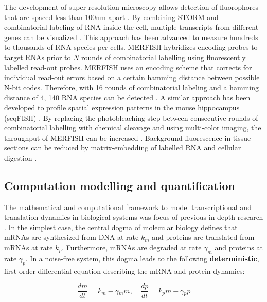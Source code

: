 The development of super-resolution microscopy allows detection of fluorophores that are spaced less than 100nm apart \citep{Sydor2015}. By combining \gls{STORM} and combinatorial labeling of RNA inside the cell, multiple transcripts from different genes can be visualized \citep{Lubeck2012}. This approach has been advanced to measure hundreds to thousands of RNA species per cells. \Gls{MERFISH} hybridizes encoding probes to target RNAs prior to $N$ rounds of combinatorial labelling using fluorescently labelled read-out probes. MERFISH uses an encoding scheme that corrects for individual read-out errors based on a certain hamming distance between possible N-bit codes. Therefore, with 16 rounds of combinatorial labeling and a hamming distance of 4, 140 RNA species can be detected \citep{Chen2015}. A similar approach has been developed to profile spatial expression patterns in the mouse hippocampus (seqFISH) \citep{Shah2016}. By replacing the photobleaching step between consecutive rounds of combinatorial labelling with chemical cleavage and using multi-color imaging, the throughput of MERFISH can be increased \citep{Moffitt2016a}. Background fluorescence in tissue sections can be reduced by matrix-embedding of labelled RNA and cellular digestion \citep{Moffitt2016}.

\subsection{Computation modelling and quantification}

The mathematical and computational framework to model transcriptional and translation dynamics in biological systems was focus of previous in depth research \citep{Tsimring2014}. In the simplest case, the central dogma of molecular biology defines that mRNAs are synthesized from DNA at rate $k_m$ and proteins are translated from mRNAs at rate $k_p$. Furthermore, mRNAs are degraded at rate $\gamma_m$ and proteins at rate $\gamma_p$. In a noise-free system, this dogma leads to the following \textbf{deterministic}, first-order differential equation describing the mRNA and protein dynamics:

\begin{equation}
\frac{dm}{dt}=k_m-\gamma{}_mm,\quad \frac{dp}{dt}=k_pm-\gamma{}_pp
\end{equation}

